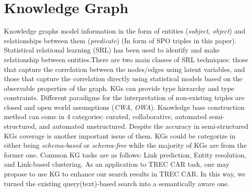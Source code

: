 \documentclass[letterpaper,12pt]{article}
\begin{document}
\section{Knowledge Graph}
Knowledge graphs model information in the form of entities (\textit{subject}, \textit{object}) and relationships between them (\textit{predicate}) (In form of SPO triples in this paper). Statistical relational learning (SRL) has been used to identify and make relationship between entities.There are two main classes of SRL techniques: those that capture the correlation between the nodes/edges using latent variables, and those that capture the correlation directly using statistical models based on the observable properties of the graph. KGs can provide type hierarchy and type constraints. Different paradigms for the interpretation of non-existing triples are closed and open world assumptions (\textit{CWA}, \textit{OWA}). Knowledge base construction method can come in 4 categories: curated, collaborative, automated semi-structured, and automated unstructured. Despite the accuracy in semi-structured KGs coverage is another important issue of them. KGs could be categorize in either being \textit{schema-based} or \textit{schema-free} while the majority of KGs are from the former one. Common KG tasks are as follows: Link prediction, Entity resolution, and Link-based clustering. As an application to TREC CAR task, one may propose to use KG to enhance our search results in TREC CAR. In this way, we turned the existing query(text)-based search into a semantically aware one.
\end{document}
